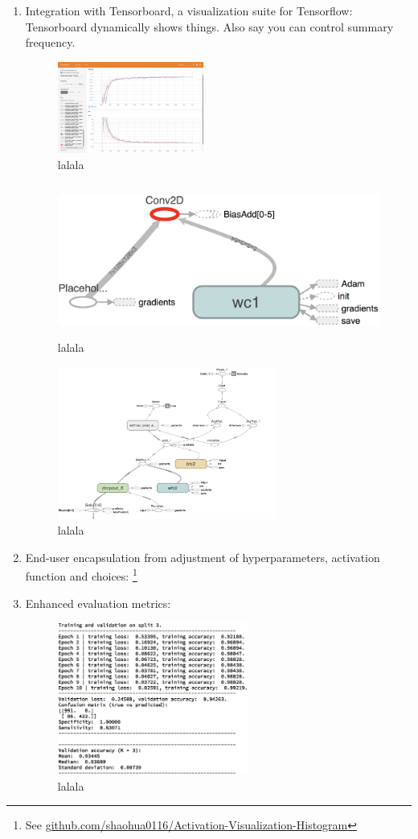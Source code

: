 \documentclass[a4paper, 11pt]{article} %
\begin{document}
	\begin{enumerate}
		\item Integration with Tensorboard, a visualization suite for 
		Tensorflow: Tensorboard dynamically shows things. Also say you can 
		control summary frequency.
		\begin{figure}[H]
			\centering
			\includegraphics[height=3cm]{figures/tb_acc_loss}
			\caption{lalala}
		\end{figure}
		\begin{figure}[H]
			\centering
			\includegraphics[height=5cm]{figures/tb_graph_2}
			\caption{lalala}
		\end{figure}
		\begin{figure}[H]
			\centering
			\includegraphics[height=5cm]{figures/tb_graph_1}
			\caption{lalala}
		\end{figure}
		\item End-user encapsulation from adjustment of hyperparameters, 
		activation function and choices: \cite{selu-motivation} \footnote{See 
		\hyperlink{https://github.com/shaohua0116/Activation-Visualization-Histogram}
			{github.com/shaohua0116/Activation-Visualization-Histogram}}
		\item Enhanced evaluation metrics:
		\begin{figure}[H]
			\centering
			\includegraphics[height=5cm]{figures/floydhub_results_example}
			\caption{lalala}
		\end{figure}
	\end{enumerate}
\end{document}
